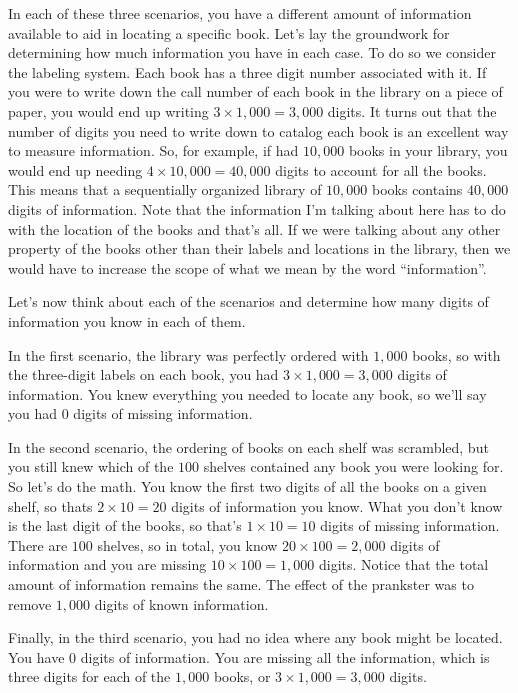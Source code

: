 \documentclass[11pt, oneside]{article}   	%
\begin{document}
In each of these three scenarios, you have a different amount of information
available to aid in locating a specific book.  Let's lay the groundwork for
determining how much information you have in each case.  To do so we consider
the labeling system.  Each book has a three digit number associated with it.  If
you were to write down the call number of each book in the library on a piece of
paper, you would end up writing $3\times1,000=3,000$ digits.  It turns out that
the number of digits you need to write down to catalog each book is an excellent
way to measure information.  So, for example, if had $10,000$ books in your
library, you would end up needing $4\times10,000=40,000$ digits to account for
all the books. This means that a sequentially organized library of $10,000$
books contains $40,000$ digits of information.  Note that the information I'm
talking about here has to do with the location of the books and that's all.  If
we were talking about any other property of the books other than their labels
and locations in the library, then we would have to increase the scope of what
we mean by the word ``information''.

Let's now think about each of the scenarios and determine how many digits of
information you know in each of them.

In the first scenario, the library was perfectly ordered with $1,000$ books, so
with the three-digit labels on each book, you had $3\times1,000=3,000$ digits of
information.  You knew everything you needed to locate any book, so we'll say
you had $0$ digits of missing information.

In the second scenario, the ordering of books on each shelf was scrambled, but
you still knew which of the $100$ shelves contained any book you were looking
for.  So let's do the math. You know the first two digits of all the books on a
given shelf, so thats $2\times10=20$ digits of information you know.  What you
don't know is the last digit of the books, so that's $1\times10=10$ digits of
missing information.  There are $100$ shelves, so in total, you know
$20\times100=2,000$ digits of information and you are missing
$10\times100=1,000$ digits.  Notice that the total amount of
information remains the same.  The effect of the prankster was to remove $1,000$
digits of known information.

Finally, in the third scenario, you had no idea where any book might be located.
You have $0$ digits of information.  You are missing all the information, which
is three digits for each of the $1,000$ books, or $3\times1,000=3,000$ digits.
\end{document}
